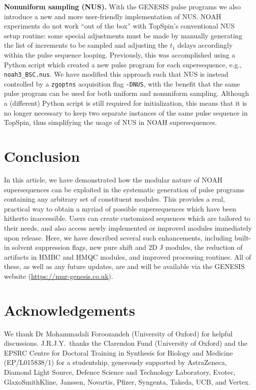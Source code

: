 \documentclass[a4paper,11pt]{article}
\newcommand{\theurl}{\url{https://nmr-genesis.co.uk}}
\begin{document}
\begin{refsection}
\textbf{Nonuniform sampling (NUS).} With the GENESIS pulse programs we also introduce a new and more user-friendly implementation of NUS.
NOAH experiments do not work ``out of the box'' with TopSpin's conventional NUS setup routine: some special adjustments must be made by manually generating the list of increments to be sampled and adjusting the \(t_1\) delays accordingly within the pulse sequence looping.
Previously, this was accomplished using a Python script which created a new pulse program for each supersequence, e.g., \texttt{noah3\_BSC.nus}.\autocite{Claridge2019MRC}
We have modified this approach such that NUS is instead controlled by a \texttt{zgoptns} acquisition flag \texttt{-DNUS}, with the benefit that the same pulse program can be used for both uniform and nonuniform sampling.
Although a (different) Python script is still required for initialization, this means that it is no longer necessary to keep two separate instances of the same pulse sequence in TopSpin, thus simplifying the usage of NUS in NOAH supersequences.


\section{Conclusion}

In this article, we have demonstrated how the modular nature of NOAH supersequences can be exploited in the systematic generation of pulse programs containing any arbitrary set of constituent modules.
This provides a real, practical way to obtain a myriad of possible supersequences which have been hitherto inaccessible.
Users can create customized sequences which are tailored to their needs, and also access newly implemented or improved modules immediately upon release.
Here, we have described several such enhancements, including built-in solvent suppression flags, new pure shift and 2D J modules, the reduction of artifacts in HMBC and HMQC modules, and improved processing routines.
All of these, as well as any future updates, are and will be available via the GENESIS website (\theurl{}).

\section*{Acknowledgements}

We thank Dr Mohammadali Foroozandeh (University of Oxford) for helpful discussions.
J.R.J.Y.\ thanks the Clarendon Fund (University of Oxford) and the EPSRC Centre for Doctoral Training in Synthesis for Biology and Medicine (EP/L015838/1) for a studentship, generously supported by AstraZeneca, Diamond Light Source, Defence Science and Technology Laboratory, Evotec, GlaxoSmithKline, Janssen, Novartis, Pfizer, Syngenta, Takeda, UCB, and Vertex.

\AtNextBibliography{\small}
\printbibliography{}
\end{refsection}
\end{document}
